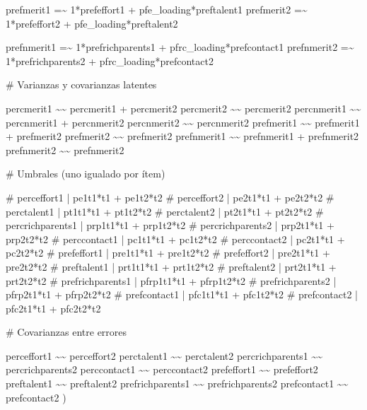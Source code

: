 \documentclass[
  12pt,
]{article}
\newenvironment{Shaded}{\begin{snugshade}}{\end{snugshade}}
\newcommand{\NormalTok}[1]{\textcolor[rgb]{0.00,0.23,0.31}{#1}}
\newcommand{\StringTok}[1]{\textcolor[rgb]{0.13,0.47,0.30}{#1}}
\begin{document}
\begin{Shaded}
\begin{Highlighting}[]
\StringTok{prefmerit1  =\textasciitilde{} 1*prefeffort1 + pfe\_loading*preftalent1}
\StringTok{prefmerit2  =\textasciitilde{} 1*prefeffort2 + pfe\_loading*preftalent2}

\StringTok{prefnmerit1 =\textasciitilde{} 1*prefrichparents1 + pfrc\_loading*prefcontact1}
\StringTok{prefnmerit2 =\textasciitilde{} 1*prefrichparents2 + pfrc\_loading*prefcontact2}


\StringTok{\# Varianzas y covarianzas latentes}

\StringTok{percmerit1  \textasciitilde{}\textasciitilde{} percmerit1 + percmerit2}
\StringTok{percmerit2  \textasciitilde{}\textasciitilde{} percmerit2}
\StringTok{percnmerit1 \textasciitilde{}\textasciitilde{} percnmerit1 + percnmerit2}
\StringTok{percnmerit2 \textasciitilde{}\textasciitilde{} percnmerit2}
\StringTok{prefmerit1  \textasciitilde{}\textasciitilde{} prefmerit1 + prefmerit2}
\StringTok{prefmerit2  \textasciitilde{}\textasciitilde{} prefmerit2}
\StringTok{prefnmerit1 \textasciitilde{}\textasciitilde{} prefnmerit1 + prefnmerit2}
\StringTok{prefnmerit2 \textasciitilde{}\textasciitilde{} prefnmerit2}


\StringTok{\# Umbrales (uno igualado por ítem)}

\StringTok{\# perceffort1 | pe1t1*t1 + pe1t2*t2}
\StringTok{\# perceffort2 | pe2t1*t1 + pe2t2*t2}
\StringTok{\# perctalent1 | pt1t1*t1 + pt1t2*t2}
\StringTok{\# perctalent2 | pt2t1*t1 + pt2t2*t2}
\StringTok{\# percrichparents1 | prp1t1*t1 + prp1t2*t2}
\StringTok{\# percrichparents2 | prp2t1*t1 + prp2t2*t2}
\StringTok{\# perccontact1 | pc1t1*t1 + pc1t2*t2}
\StringTok{\# perccontact2 | pc2t1*t1 + pc2t2*t2}
\StringTok{\# prefeffort1 | pre1t1*t1 + pre1t2*t2}
\StringTok{\# prefeffort2 | pre2t1*t1 + pre2t2*t2}
\StringTok{\# preftalent1 | prt1t1*t1 + prt1t2*t2}
\StringTok{\# preftalent2 | prt2t1*t1 + prt2t2*t2}
\StringTok{\# prefrichparents1 | pfrp1t1*t1 + pfrp1t2*t2}
\StringTok{\# prefrichparents2 | pfrp2t1*t1 + pfrp2t2*t2}
\StringTok{\# prefcontact1 | pfc1t1*t1 + pfc1t2*t2}
\StringTok{\# prefcontact2 | pfc2t1*t1 + pfc2t2*t2}
\StringTok{ }

\StringTok{\# Covarianzas entre errores}

\StringTok{perceffort1 \textasciitilde{}\textasciitilde{} perceffort2}
\StringTok{perctalent1 \textasciitilde{}\textasciitilde{} perctalent2}
\StringTok{percrichparents1 \textasciitilde{}\textasciitilde{} percrichparents2}
\StringTok{perccontact1 \textasciitilde{}\textasciitilde{} perccontact2}
\StringTok{prefeffort1 \textasciitilde{}\textasciitilde{} prefeffort2}
\StringTok{preftalent1 \textasciitilde{}\textasciitilde{} preftalent2}
\StringTok{prefrichparents1 \textasciitilde{}\textasciitilde{} prefrichparents2}
\StringTok{prefcontact1 \textasciitilde{}\textasciitilde{} prefcontact2}
\StringTok{\textquotesingle{}}\NormalTok{)}



\end{Highlighting}
\end{Shaded}
\end{document}
